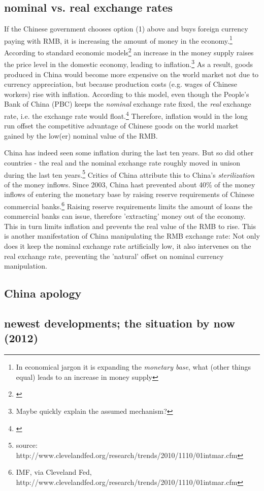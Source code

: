 \documentclass[11pt]{article}
\begin{document}
 
\subsection{nominal vs. real exchange rates}

If the Chinese government chooses option (1) above and buys foreign currency paying with RMB, it is increasing the amount of money in the economy.\footnote{In economical jargon it is expanding the \emph{monetary base}, what (other things equal) leads to an increase in money supply} According to standard economic models\footnote{\cite[pp. ?]{Krugman2008}} an increase in the money supply raises the price level in the domestic economy, leading to inflation.\footnote{Maybe quickly explain the assumed mechanism?} As a result, goods produced in China would become more expensive on the world market not due to currency appreciation, but because production costs (e.g. wages of Chinese workers) rise with inflation. According to this model, even though the People's Bank of China (PBC) keeps the \emph{nominal} exchange rate fixed, the \emph{real} exchange rate, i.e. the exchange rate would float.\footnote{\cite[p. 509]{Krugman}} Therefore, inflation would in the long run offset the competitive advantage of Chinese goods on the world market gained by the low(er) nominal value of the RMB.

China has indeed seen some inflation during the last ten years. But so did other countries - the real and the nominal exchange rate roughly moved in unison during the last ten years.\footnote{source: http://www.clevelandfed.org/research/trends/2010/1110/01intmar.cfm}%
Critics of China attribute this to China's \emph{sterilization} of the money inflows. Since 2003, China hast prevented about 40\% of the money inflows of entering the monetary base by raising reserve requirements of Chinese commercial banks.\footnote{IMF, via Cleveland Fed, http://www.clevelandfed.org/research/trends/2010/1110/01intmar.cfm}%
Raising reserve requirements limits the amount of loans the commercial banks can issue, therefore 'extracting' money out of the economy. This in turn limits inflation and prevents the real value of the RMB to rise. This is another manifestation of China manipulating the RMB exchange rate: Not only does it keep the nominal exchange rate artificially low, it also intervenes on the real exchange rate, preventing the 'natural' offset on nominal currency manipulation.



\subsection{China apology}


\subsection{newest developments; the situation by now (2012)}
\end{document}
